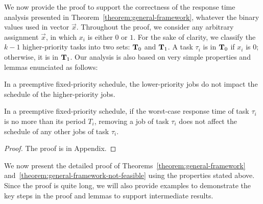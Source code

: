 
We now provide the proof to support the correctness of the response time analysis presented in
Theorem~\ref{theorem:general-framework}, whatever the binary values
used in vector $\vec{x}$.  %
Throughout the proof, we consider any arbitrary assignment
$\vec{x}$, in which $x_i$ is either $0$ or $1$. For the sake of clarity, we classify the $k-1$
higher-priority tasks into two sets: ${\bf T}_0$ and ${\bf T}_1$. A
task $\tau_i$ is in ${\bf T}_0$ if $x_i$ is $0$; otherwise, it is in
${\bf T}_1$.
Our analysis is also based on very simple properties and lemmas enunciated as follows:

\begin{Property}
\label{prop:lower-priority}
In a preemptive fixed-priority schedule, the lower-priority jobs do not impact the schedule of the higher-priority jobs.
\end{Property}


\begin{Lemma}
\label{lemma:remove-same-task}
In a preemptive fixed-priority schedule, if the worst-case response time of task $\tau_i$ is no more than its period $T_i$, removing a job of task $\tau_i$ does not affect the schedule of any other jobs of task $\tau_i$.
\end{Lemma}
\begin{proof}
The proof is in Appendix\citetechreport{}.
\end{proof}


We now present the detailed proof of
Theorems~\ref{theorem:general-framework} and~\ref{theorem:general-framework-not-feasible} using the properties stated above. Since the proof is quite long, we 
will also provide examples to demonstrate the key steps in the proof and lemmas to support intermediate results.


